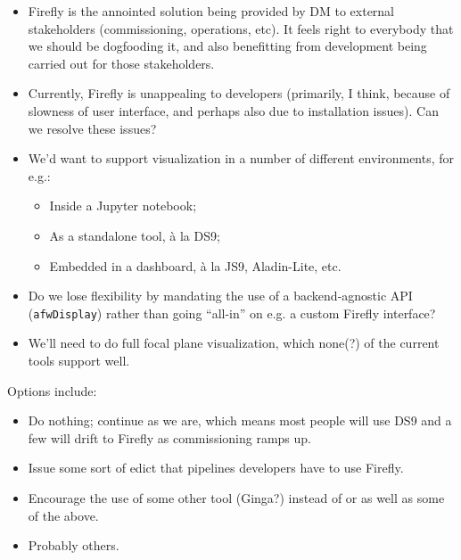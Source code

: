 \begin{itemize}

  \item{Firefly is the annointed solution being provided by DM to external
  stakeholders (commissioning, operations, etc). It feels right to everybody
  that we should be dogfooding it, and also benefitting from development being
  carried out for those stakeholders.}

  \item{Currently, Firefly is unappealing to developers (primarily, I think,
  because of slowness of user interface, and perhaps also due to installation
  issues). Can we resolve these issues?}

  \item{We'd want to support visualization in a number of different
  environments, for e.g.:

    \begin{itemize}

      \item{Inside a Jupyter notebook;}
      \item{As a standalone tool, \`a la DS9;}
      \item{Embedded in a \gls{dashboard}, \`a la JS9, Aladin-Lite, etc.}

    \end{itemize}
  }

  \item{Do we lose flexibility by mandating the use of a backend-agnostic API
  (\texttt{afwDisplay}) rather than going ``all-in'' on e.g. a custom Firefly
  interface?}

  \item{We'll need to do full focal plane visualization, which none(?) of the
  current tools support well.}

\end{itemize}

Options include:

\begin{itemize}

  \item{Do nothing; continue as we are, which means most people will use DS9
  and a few will drift to Firefly as commissioning ramps up.}

  \item{Issue some sort of edict that pipelines developers have to use
  Firefly.}

  \item{Encourage the use of some other tool (Ginga?) instead of or as well as
  some of the above.}

  \item{Probably others.}

\end{itemize}

